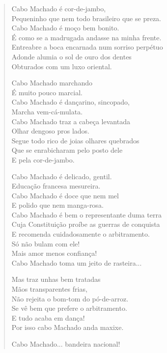 \begin{verse}
Cabo Machado é cor-de-jambo,\\
Pequeninho que nem todo brasileiro que se preza.\\
Cabo Machado é moço bem bonito.\\
É como se a madrugada andasse na minha frente.\\
Entreabre a boca encarnada num sorriso perpétuo\\
Adonde alumia o sol de ouro dos dentes\\
Obturados com um luxo oriental.

Cabo Machado marchando\\
É muito pouco marcial.\\
Cabo Machado é dançarino, sincopado,\\
Marcha vem-cá-mulata.\\
Cabo Machado traz a cabeça levantada\\
Olhar dengoso pros lados.\\
Segue todo rico de joias olhares quebrados\\
Que se enrabicharam pelo posto dele\\
E pela cor-de-jambo.

Cabo Machado é delicado, gentil.\\
Educação francesa mesureira.\\
Cabo Machado é doce que nem mel\\
E polido que nem manga-rosa.\\
Cabo Machado é bem o representante duma terra\\
Cuja Constituição proíbe as guerras de conquista\\
E recomenda cuidadosamente o arbitramento.\\
Só não bulam com ele!\\
Mais amor menos confiança!\\
Cabo Machado toma um jeito de rasteira...

Mas traz unhas bem tratadas\\
Mãos transparentes frias,\\
Não rejeita o bom-tom do pó-de-arroz.\\
Se vê bem que prefere o arbitramento.\\
E tudo acaba em dança!\\
Por isso cabo Machado anda maxixe.

Cabo Machado... bandeira nacional!
\end{verse}


